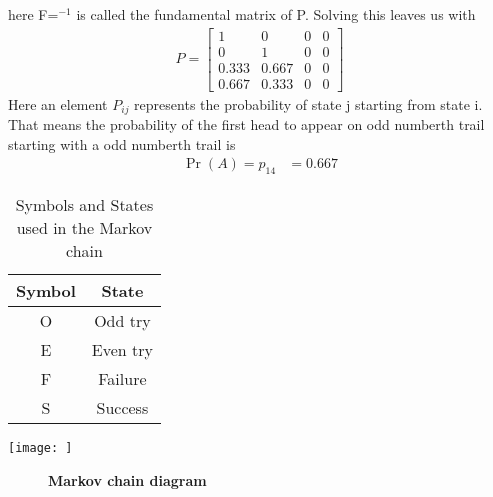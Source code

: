 \documentclass[journal,12pt,twocolumn]{IEEEtran}
\begin{document}
here F=$^{-1}$ is called the fundamental matrix of P. Solving this leaves us with 
\begin{align}
P = 
\begin{bmatrix}
1 & 0 & 0 & 0 \\
0 & 1 & 0 & 0 \\
0.333 & 0.667 & 0 & 0 \\
0.667 & 0.333 & 0 & 0
\end{bmatrix}
\end{align}
Here an element $P_{ij}$ represents the probability of state j starting from state i. That means the probability of the first head to appear on odd numberth trail starting with a odd numberth trail is  
\begin{align}
   \Pr(A) = p_{14} 
   & = 0.667
\end{align}

\begin{table}
\centering
\begin{tabular}{|c|c|}
\hline
Symbol & State  \\ \hline
O                      & Odd try     \\ \hline
E                      & Even try    \\ \hline
F                      & Failure     \\ \hline
S                      & Success     \\ \hline
\end{tabular}
\caption{Symbols and States used in the Markov chain}
\label{tab:Table 5.10}
\end{table}

\centering
\texttt{[image: ]}
\begin{figure}[h]
\caption*{\textbf{Markov chain diagram}}
\label{Eq.1.0.0}
\centering
{}
\end{figure}
\end{document}
